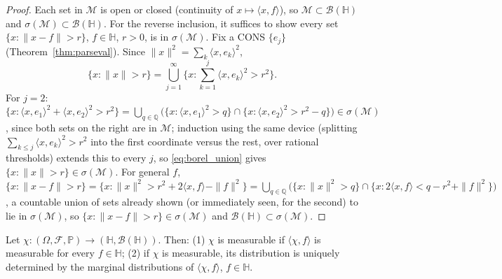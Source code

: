 \begin{proof}
Each set in $\mathcal{M}$ is open or closed (continuity of $x\mapsto
\langle x,f\rangle$), so $\mathcal{M}\subset\mathcal{B}(\mathbb{H})$ and
$\sigma(\mathcal{M})\subset\mathcal{B}(\mathbb{H})$. For the reverse
inclusion, it suffices to show every set $\{x:\|x-f\|>r\}$, $f\in
\mathbb{H}$, $r>0$, is in $\sigma(\mathcal{M})$. Fix a CONS $\{e_j\}$
(Theorem~\ref{thm:parseval}). Since $\|x\|^2=\sum_k\langle x,e_k\rangle^2$,
\begin{equation}
\{x:\|x\|>r\} = \bigcup_{j=1}^\infty\Big\{x:\sum_{k=1}^j\langle x,e_k
\rangle^2>r^2\Big\}.
\label{eq:borel_union}
\end{equation}
For $j=2$: $\{x:\langle x,e_1\rangle^2+\langle x,e_2\rangle^2>r^2\} =
\bigcup_{q\in\mathbb{Q}}\big(\{x:\langle x,e_1\rangle^2>q\}\cap\{x:
\langle x,e_2\rangle^2>r^2-q\}\big) \in\sigma(\mathcal{M})$, since both
sets on the right are in $\mathcal{M}$; induction using the same device
(splitting $\sum_{k\leq j}\langle x,e_k\rangle^2>r^2$ into the first
coordinate versus the rest, over rational thresholds) extends this to
every $j$, so \eqref{eq:borel_union} gives $\{x:\|x\|>r\}\in\sigma
(\mathcal{M})$. For general $f$, $\{x:\|x-f\|>r\} = \{x:\|x\|^2>r^2+
2\langle x,f\rangle-\|f\|^2\} = \bigcup_{q\in\mathbb{Q}}\big(\{x:\|x\|^2>q
\}\cap\{x:2\langle x,f\rangle<q-r^2+\|f\|^2\}\big)$, a countable union of
sets already shown (or immediately seen, for the second) to lie in
$\sigma(\mathcal{M})$, so $\{x:\|x-f\|>r\}\in\sigma(\mathcal{M})$ and
$\mathcal{B}(\mathbb{H})\subset\sigma(\mathcal{M})$.
\end{proof}

\begin{theorem}
\label{thm:random_element_char}
Let $\chi:(\Omega,\mathcal{F},\mathbb{P})\to(\mathbb{H},\mathcal{B}
(\mathbb{H}))$. Then: (1) $\chi$ is measurable if $\langle\chi,f\rangle$
is measurable for every $f\in\mathbb{H}$; (2) if $\chi$ is measurable, its
distribution is uniquely determined by the marginal distributions of
$\langle\chi,f\rangle$, $f\in\mathbb{H}$.
\end{theorem}

